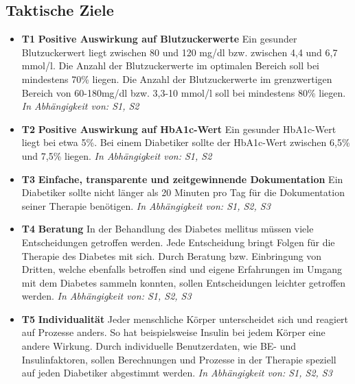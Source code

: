 \documentclass[a4paper,11pt]{article}%
\renewcommand{\\}{\vspace*{0.5\baselineskip} \newline}
\begin{document}
\subsection{Taktische Ziele}
\begin{itemize}
	\item \lbrack \textbf{T1}\rbrack  \textbf{ Positive Auswirkung auf Blutzuckerwerte} \\
	Ein gesunder Blutzuckerwert liegt zwischen 80 und 120 mg/dl bzw. zwischen 4,4 und 6,7 mmol/l. Die Anzahl der Blutzuckerwerte im optimalen Bereich soll bei mindestens 70\% liegen. Die Anzahl der Blutzuckerwerte im grenzwertigen Bereich von 60-180mg/dl bzw. 3,3-10 mmol/l soll bei mindestens 80\% liegen.\newline
	\emph{In Abhängigkeit von: S1, S2} 
	\item \lbrack \textbf{T2}\rbrack  \textbf{ Positive Auswirkung auf HbA1c-Wert} \\
	Ein gesunder HbA1c-Wert liegt bei etwa 5\%. Bei einem Diabetiker sollte der HbA1c-Wert zwischen 6,5\% und 7,5\% liegen. \newline
	\emph{In Abhängigkeit von: S1, S2} 
	\item \lbrack \textbf{T3}\rbrack  \textbf{ Einfache, transparente und zeitgewinnende Dokumentation} \\
	Ein Diabetiker sollte nicht länger als 20 Minuten pro Tag für die Dokumentation seiner Therapie benötigen.\newline
	\emph{In Abhängigkeit von: S1, S2, S3} 
	\item \lbrack \textbf{T4}\rbrack  \textbf{ Beratung} \\
	In der Behandlung des Diabetes mellitus müssen viele Entscheidungen getroffen werden. Jede Entscheidung bringt Folgen für die Therapie des Diabetes mit sich. Durch Beratung bzw. Einbringung von Dritten, welche ebenfalls betroffen sind und eigene Erfahrungen im Umgang mit dem Diabetes sammeln konnten, sollen Entscheidungen leichter getroffen werden. \newline
	\emph{In Abhängigkeit von: S1, S2, S3} 
	\item \lbrack \textbf{T5}\rbrack  \textbf{ Individualität} \\  
	Jeder menschliche Körper unterscheidet sich und reagiert auf Prozesse anders. So hat beispielsweise Insulin bei jedem Körper eine andere Wirkung. Durch individuelle Benutzerdaten, wie BE- und Insulinfaktoren, sollen Berechnungen und Prozesse in der Therapie speziell auf jeden Diabetiker abgestimmt werden. \newline
	\emph{In Abhängigkeit von: S1, S2, S3} 
\end{itemize}
\end{document}
